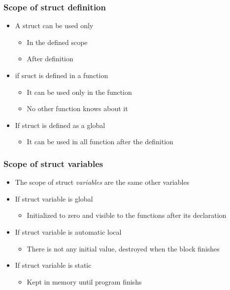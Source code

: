 \documentclass{../c-lecture}
\begin{document}
\begin{frame}
  \frametitle{Scope of struct definition}
  \begin{itemize}
    \item A struct can be used only
    \begin{itemize}
      \item In the defined scope
      \item After definition
    \end{itemize}
    \item if sruct is defined in a function
    \begin{itemize}
      \item It can be used only in the function
      \item No other function knows about it
    \end{itemize}
    \item If struct is defined as a global
    \begin{itemize}
      \item It can be used in all function after the definition
    \end{itemize}
  \end{itemize}
\end{frame}
\begin{frame}
  \frametitle{Scope of struct variables}
  \begin{itemize}
    \item
      The scope of struct \textit{\color{YellowOrange} variables} are the same
      other variables
    \item If struct variable is global
    \begin{itemize}
      \item
        Initialized to zero and visible to the functions after its declaration
    \end{itemize}
    \item If struct variable is automatic local
    \begin{itemize}
      \item There is not any initial value, destroyed when the block finishes
    \end{itemize}
    \item If struct variable is static
    \begin{itemize}
      \item Kept in memory until program finishs
    \end{itemize}
  \end{itemize}
\end{frame}
\end{document}
